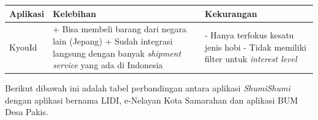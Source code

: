 \documentclass[a4paper]{article}
\begin{document}
\begin{centering}
\begin{longtable}{|m{3cm}|p{5cm}|p{5cm}|}
    \hline
    Aplikasi & Kelebihan                                                  & Kekurangan                \\
    \hline
    KyouId
             & + Bisa membeli barang dari negara lain (Jepang) \newline
    + Sudah integrasi langsung dengan banyak \textit{shipment service} yang ada di Indonesia \newline
             & - Hanya terfokus kesatu jenis hobi \newline
    - Tidak memiliki filter untuk \textit{interest level}                                        \\
    \hline

\end{longtable}
\end{centering}
\newpage
Berikut dibawah ini adalah tabel perbandingan antara aplikasi \textit{ShumiShumi} dengan aplikasi bernama LIDI\autocite{lidi-car-rental}, e-Nelayan Kota Samarahan\autocite[1-10]{fishes-marketplace} dan aplikasi BUM Desa Pakis\autocite{bum-mekarsari}.
\end{document}
